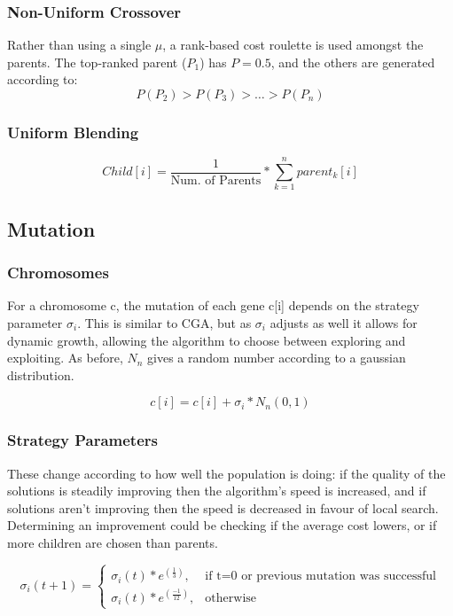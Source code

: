 \subsubsection{Non-Uniform Crossover}
Rather than using a single $\mu$, a rank-based cost roulette is used amongst the parents. The top-ranked parent ($P_1$) has $P =0.5$, and the others are generated according to: 
\[
P(P_2) > P(P_3) > \dotso > P(P_n)
\]

\subsubsection{Uniform Blending}
\[
Child[i] = \frac{1}{\text{Num. of Parents}} * \sum_{k=1}^{n} parent_k[i] 
\]

\subsection{Mutation}
\subsubsection{Chromosomes}
For a chromosome c, the mutation of each gene c[i] depends on the strategy parameter $\sigma_i$. This is similar to CGA, but as $\sigma_i$ adjusts as well it allows for dynamic growth, allowing the algorithm to choose between exploring and exploiting. As before, $N_n$ gives a random number according to a gaussian distribution.

\begin{equation}
    c[i] = c[i] + \sigma_i * N_n(0,1)
\end{equation}

\subsubsection{Strategy Parameters}
These change according to how well the population is doing: if the quality of the solutions is steadily improving then the algorithm's speed is increased, and if solutions aren't improving then the speed is decreased in favour of local search. Determining an improvement could be checking if the average cost lowers, or if more children are chosen than parents.

\begin{equation}
    \sigma_i(t+1) = 
    \begin{cases}
    \sigma_i(t) * e^(\frac{1}{3}), & \text{if t=0 or previous mutation was successful} \\
    \sigma_i(t) * e^(\frac{-1}{12}), & \text{otherwise}
    \end{cases}
\end{equation}

